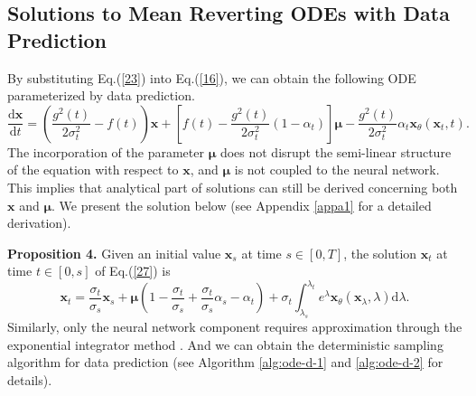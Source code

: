 \subsection{Solutions to Mean Reverting ODEs with Data Prediction}

By substituting Eq.(\ref{23}) into Eq.(\ref{16}), we can obtain the following ODE parameterized by data prediction. 
\begin{equation}
\frac{\mathrm{d}\boldsymbol{x}}{\mathrm{d}t}=\left(\frac{g^2(t)}{2\sigma^2_t}-f(t)\right)\boldsymbol{x}+\left[f(t)-\frac{g^2(t)}{2\sigma_t^2}(1-\alpha_t)\right]\boldsymbol\mu-\frac{g^2(t)}{2\sigma_t^2}\alpha_t\boldsymbol{x}_\theta(\boldsymbol{x}_t,t).
\label{27}
\end{equation}
The incorporation of the parameter $\boldsymbol{\mu}$ does not disrupt the semi-linear structure of the equation with respect to $\boldsymbol{x}$, and $\boldsymbol{\mu}$ is not coupled to the neural network. This implies that analytical part of solutions can still be derived concerning both $\boldsymbol{x}$ and $\boldsymbol{\mu}$. We present the solution below (see Appendix \ref{appa1} for a detailed derivation).

\textbf{Proposition 4.} Given an initial value $\boldsymbol{x}_s$ at time $s\in[0,T]$, the solution $\boldsymbol{x}_t$ at time $t\in[0,s]$ of Eq.(\ref{27}) is 
\begin{equation}
\boldsymbol{x}_t=\frac{\sigma_t}{\sigma_s}\boldsymbol{x}_s
+\boldsymbol\mu\left(1-\frac{\sigma_t}{\sigma_s}+\frac{\sigma_t}{\sigma_s}\alpha_s-\alpha_t \right)
+\sigma_t\int_{\lambda_s}^{\lambda_t}e^{\lambda}\boldsymbol{x}_\theta(\boldsymbol{x}_\lambda,\lambda)\mathrm{d}\lambda.
\label{28}
\end{equation}
Similarly, only the neural network component requires approximation through the exponential integrator method \citep{hochbruck2005explicit,hochbruck2010exponential}. And we can obtain the deterministic sampling algorithm for data prediction (see Algorithm \ref{alg:ode-d-1} and \ref{alg:ode-d-2} for details).


